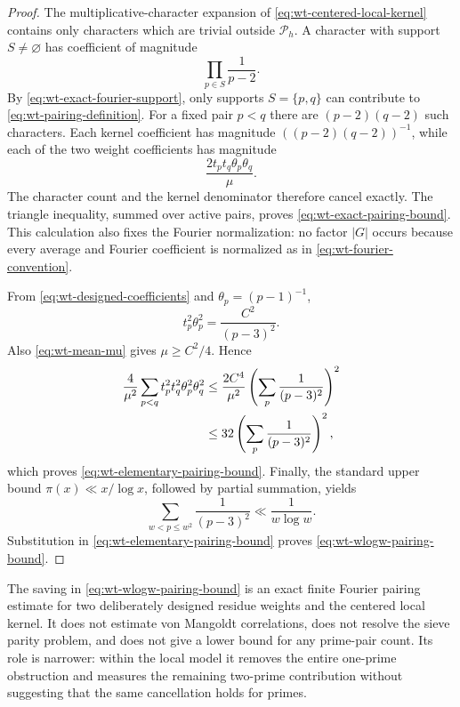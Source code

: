 \begin{proof}
The multiplicative-character expansion of
\eqref{eq:wt-centered-local-kernel} contains only characters which are
trivial outside $\mathcal P_h$.  A character with support $S\ne\varnothing$
has coefficient of magnitude
\begin{equation}
 \prod_{p\in S}\frac1{p-2}.
 \label{eq:wt-kernel-coefficient-magnitude}
\end{equation}
By \eqref{eq:wt-exact-fourier-support}, only supports $S=\{p,q\}$ can
contribute to \eqref{eq:wt-pairing-definition}.  For a fixed pair $p<q$
there are $(p-2)(q-2)$ such characters.  Each kernel coefficient has
magnitude $((p-2)(q-2))^{-1}$, while each of the two weight coefficients has
magnitude
\begin{equation}
 \frac{2t_pt_q\theta_p\theta_q}{\mu}.
 \label{eq:wt-pair-weight-coefficient}
\end{equation}
The character count and the kernel denominator therefore cancel exactly.
The triangle inequality, summed over active pairs, proves
\eqref{eq:wt-exact-pairing-bound}.  This calculation also fixes the Fourier
normalization: no factor $|G|$ occurs because every average and Fourier
coefficient is normalized as in \eqref{eq:wt-fourier-convention}.

From \eqref{eq:wt-designed-coefficients} and
$\theta_p=(p-1)^{-1}$,
\begin{equation}
 t_p^2\theta_p^2=\frac{C^2}{(p-3)^2}.
 \label{eq:wt-t-theta-simplification}
\end{equation}
Also \eqref{eq:wt-mean-mu} gives $\mu\ge C^2/4$.  Hence
\begin{align}
 \frac4{\mu^2}\sum_{p<q}t_p^2t_q^2\theta_p^2\theta_q^2
 &\le \frac{2C^4}{\mu^2}
       \left(\sum_p\frac1{(p-3)^2}\right)^2 \notag\\
 &\le32\left(\sum_p\frac1{(p-3)^2}\right)^2,
 \label{eq:wt-constant-32-check}
\end{align}
which proves \eqref{eq:wt-elementary-pairing-bound}.  Finally, the standard
upper bound $\pi(x)\ll x/\log x$, followed by partial summation, yields
\begin{equation}
 \sum_{w<p\le w^2}\frac1{(p-3)^2}
 \ll\frac1{w\log w}.
 \label{eq:wt-prime-reciprocal-square-sum}
\end{equation}
Substitution in \eqref{eq:wt-elementary-pairing-bound} proves
\eqref{eq:wt-wlogw-pairing-bound}.
\end{proof}

\begin{remark}
\label{rem:wt-scope-of-suppression}
The saving in \eqref{eq:wt-wlogw-pairing-bound} is an exact finite Fourier
pairing estimate for two deliberately designed residue weights and the
centered local kernel.  It does not estimate von Mangoldt correlations,
does not resolve the sieve parity problem, and does not give a lower bound
for any prime-pair count.  Its role is narrower: within the local model it
removes the entire one-prime obstruction and measures the remaining
two-prime contribution without suggesting that the same cancellation holds
for primes.
\end{remark}
